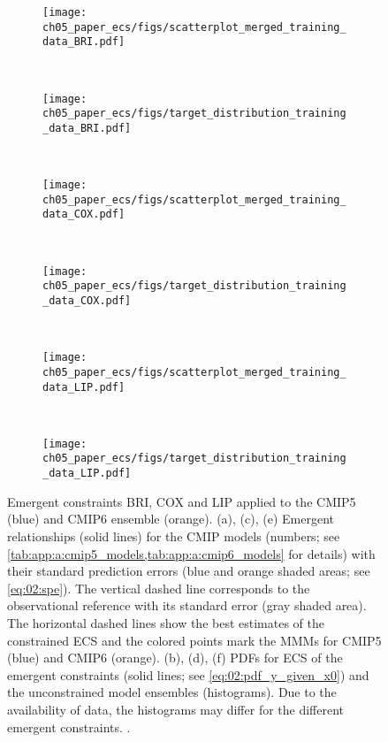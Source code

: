 \begin{figure}[p]
  \centering
  \begin{subfigure}[b]{\SmallSubfigureWidth{}}
    \texttt{[image: 
      ch05\_paper\_ecs/figs/scatterplot\_merged\_training\_data\_BRI.pdf]}
    \caption{}
    \label{fig:05:bri_cox_lip:a}
  \end{subfigure}
  ~
  \begin{subfigure}[b]{\SmallSubfigureWidth{}}
    \texttt{[image: 
      ch05\_paper\_ecs/figs/target\_distribution\_training\_data\_BRI.pdf]}
    \caption{}
    \label{fig:05:bri_cox_lip:b}
  \end{subfigure}
  \\
  \begin{subfigure}[b]{\SmallSubfigureWidth{}}
    \texttt{[image: 
      ch05\_paper\_ecs/figs/scatterplot\_merged\_training\_data\_COX.pdf]}
    \caption{}
    \label{fig:05:bri_cox_lip:c}
  \end{subfigure}
  ~
  \begin{subfigure}[b]{\SmallSubfigureWidth{}}
    \texttt{[image: 
  ch05\_paper\_ecs/figs/target\_distribution\_training\_data\_COX.pdf]}
    \caption{}
    \label{fig:05:bri_cox_lip:d}
  \end{subfigure}
  \\
  \begin{subfigure}[b]{\SmallSubfigureWidth{}}
    \texttt{[image: 
      ch05\_paper\_ecs/figs/scatterplot\_merged\_training\_data\_LIP.pdf]}
    \caption{}
    \label{fig:05:bri_cox_lip:e}
  \end{subfigure}
  ~
  \begin{subfigure}[b]{\SmallSubfigureWidth{}}
    \texttt{[image: 
  ch05\_paper\_ecs/figs/target\_distribution\_training\_data\_LIP.pdf]}
    \caption{}
    \label{fig:05:bri_cox_lip:f}
  \end{subfigure}
  \caption{Emergent constraints BRI, COX and LIP applied to the \acs{CMIP}5
    (blue) and \acs{CMIP}6 ensemble (orange). (a), (c), (e) Emergent
    relationships (solid lines) for the \acs{CMIP} models (numbers; see
    \cref{tab:app:a:cmip5_models,tab:app:a:cmip6_models} for details) with
    their standard prediction errors (blue and orange shaded areas; see
    \cref{eq:02:spe}). The vertical dashed line corresponds to the
    observational reference with its standard error (gray shaded area). The
    horizontal dashed lines show the best estimates of the constrained
    \acf{ECS} and the colored points mark the \aclp{MMM} for \acs{CMIP}5
    (blue) and \acs{CMIP}6 (orange). (b), (d), (f) \Aclp{PDF} for \acs{ECS} of
    the emergent constraints (solid lines; see \cref{eq:02:pdf_y_given_x0})
    and the unconstrained model ensembles (histograms). Due to the
    availability of data, the histograms may differ for the different emergent
    constraints. .}
  \label{fig:05:bri_cox_lip}
\end{figure}

